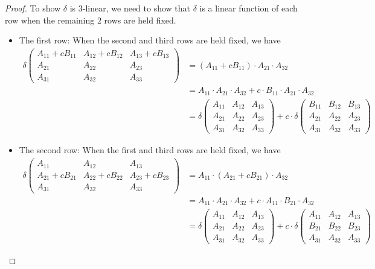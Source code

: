 \begin{proof}
To show \(\delta\) is \(3\)-linear, we need to show that \(\delta\) is a linear function of each row when the remaining \(2\) rows are held fixed.

\begin{itemize}
\item The first row: When the second and third rows are held fixed, we have
\begin{align*}
    \delta\begin{pmatrix}
        A_{11}+c B_{11} & A_{12}+c B_{12} & A_{13}+c B_{13} \\
        A_{21} & A_{22} & A_{23} \\
        A_{31} & A_{32} & A_{33}
    \end{pmatrix}
    & = \left(A_{11}+c B_{11}\right) \cdot A_{21} \cdot A_{32} \\
    & = A_{11} \cdot A_{21} \cdot A_{32} + c \cdot B_{11} \cdot A_{21} \cdot A_{32} \\
    & = \delta\begin{pmatrix}
        A_{11} & A_{12} & A_{13} \\
        A_{21} & A_{22} & A_{23} \\
        A_{31} & A_{32} & A_{33}
    \end{pmatrix}
    + c \cdot \delta\begin{pmatrix}
        B_{11} & B_{12} & B_{13} \\
        A_{21} & A_{22} & A_{23} \\
        A_{31} & A_{32} & A_{33}
    \end{pmatrix}
\end{align*}

\item The second row: When the first and third rows are held fixed, we have
\begin{align*}
    \delta\begin{pmatrix}
        A_{11} & A_{12} & A_{13} \\
        A_{21}+c B_{21} & A_{22}+c B_{22} & A_{23}+c B_{23} \\
        A_{31} & A_{32} & A_{33}
    \end{pmatrix}
    & = A_{11} \cdot \left( A_{21} + c B_{21} \right) \cdot A_{32} \\
    & = A_{11} \cdot A_{21} \cdot A_{32} + c \cdot A_{11} \cdot B_{21} \cdot A_{32} \\
    & = \delta\begin{pmatrix}
        A_{11} & A_{12} & A_{13} \\
        A_{21} & A_{22} & A_{23} \\
        A_{31} & A_{32} & A_{33}
    \end{pmatrix}
    + c \cdot \delta\begin{pmatrix}
        A_{11} & A_{12} & A_{13} \\
        B_{21} & B_{22} & B_{23} \\
        A_{31} & A_{32} & A_{33}
    \end{pmatrix}
\end{align*}


\end{itemize}
\end{proof}
